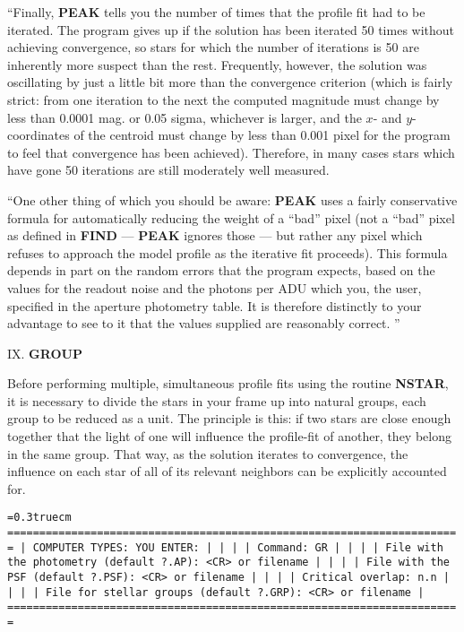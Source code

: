 ``Finally, {\bf PEAK} tells you the number of times that the profile
fit had to be iterated.  The program gives up if the solution has been
iterated 50 times without achieving convergence, so stars for which the
number of iterations is 50 are inherently more suspect than the rest.
Frequently, however, the solution was oscillating by just a little bit
more than the convergence criterion (which is fairly strict: from one
iteration to the next the computed magnitude must change by less than
0.0001 mag. or 0.05 sigma, whichever is larger, and the $x$- and
$y$-coordinates of the centroid must change by less than 0.001 pixel
for the program to feel that convergence has been achieved).
Therefore, in many cases stars which have gone 50 iterations are still
moderately well measured.

``One other thing of which you should be aware:  {\bf PEAK} uses a
fairly conservative formula for automatically reducing the weight of a
``bad'' pixel (not a ``bad'' pixel as defined in {\bf FIND} --- {\bf
PEAK} ignores those --- but rather any pixel which refuses to approach
the model profile as the iterative fit proceeds).  This formula depends
in part on the random errors that the program expects, based on the
values for the readout noise and the photons per ADU which you, the
user, specified in the aperture photometry table.  It is therefore
distinctly to your advantage to see to it that the values supplied are
reasonably correct. ''

\vfill
\eject
\noindent IX.  {\bf GROUP}

Before performing multiple, simultaneous profile fits using the routine
{\bf NSTAR}, it is necessary to divide the stars in your frame up into
natural groups, each group to be reduced as a unit.  The principle is
this:  if two stars are close enough together that the light of one
will influence the profile-fit of another, they belong in the same
group.  That way, as the solution iterates to convergence, the
influence on each star of all of its relevant neighbors can be
explicitly accounted for.

\bigskip
{\noindent\obeylines\obeyspaces\frenchspacing\tt\baselineskip=0.3truecm
=======================================================================
| COMPUTER TYPES:                                  YOU ENTER:         |
|                                                                     |
| Command:                                         GR                 |
|                                                                     |
|     File with the photometry (default ?.AP):     <CR> or filename   |
|                                                                     |
|           File with the PSF (default ?.PSF):     <CR> or filename   |
|                                                                     |
|                            Critical overlap:     n.n                |
|                                                                     |
|     File for stellar groups (default ?.GRP):     <CR> or filename   |
=======================================================================
}
\bigskip

